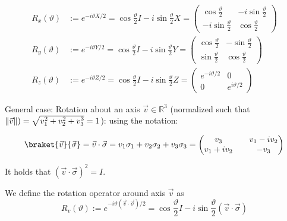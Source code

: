 \begin{align}
    R_x(\vartheta) &:= e^{-i \vartheta X / 2} 
        = \cos{\frac{\vartheta}{2}} I - i \sin{\frac{\vartheta}{2}} X 
        = \begin{pmatrix}
            \cos{\frac{\vartheta}{2}} & -i \sin{\frac{\vartheta}{2}} \\
            -i \sin{\frac{\vartheta}{2}} & \cos{\frac{\vartheta}{2}}
        \end{pmatrix} \\
    R_y(\vartheta) &:= e^{-i \vartheta Y / 2} 
        = \cos{\frac{\vartheta}{2}} I - i \sin{\frac{\vartheta}{2}} Y 
        = \begin{pmatrix}
            \cos{\frac{\vartheta}{2}} & -\sin{\frac{\vartheta}{2}} \\
            \sin{\frac{\vartheta}{2}} & \cos{\frac{\vartheta}{2}}
        \end{pmatrix} \\ 
    R_z(\vartheta) &:= e^{-i \vartheta Z / 2} 
        = \cos{\frac{\vartheta}{2}} I - i \sin{\frac{\vartheta}{2}} Z
        = \begin{pmatrix}
            e^{-i \vartheta / 2} & 0 \\
            0 & e^{i \vartheta / 2}
        \end{pmatrix}
\end{align} 
\newpage


General case: Rotation about an axis $\vec{v} \in \mathbb{R}^3$
(normalized such that $\lVert\vec{v}\rVert) = \sqrt{v_1^2 + v_2^2 + v_3^3} = 1$): \newline
using the notation:

\begin{equation}
    \braket{\vec{v}}{\vec{\sigma}} 
        = \vec{v} \cdot \vec{\sigma} 
        = v_1 \sigma_1 + v_2 \sigma_2 + v_3 \sigma_3
        = \begin{pmatrix}
            v_3 && v_1 - i v_2 \\
            v_1 + i v_2 && -v_3
        \end{pmatrix}
\end{equation}

It holds that $(\vec{v} \cdot \vec{\sigma})^2 = I$.

We define the rotation operator around axis $\vec{v}$ as 
\begin{equation}
    R_v(\vartheta) := e^{-i \vartheta (\vec{v} \cdot \vec{\sigma}) / 2} 
        = \cos{\frac{\vartheta}{2}} I - i \sin{\frac{\vartheta}{2}} (\vec{v} \cdot \vec{\sigma})
\end{equation}

